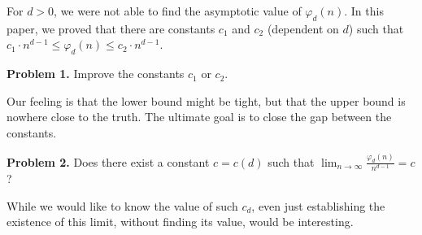 \documentclass[11pt,a4paper]{article}
\begin{document}
For $d>0$, we were not able to find the asymptotic value of $\varphi_d(n)$. In this paper, we proved that there are constants $c_1$ and $c_2$ (dependent on $d$) such that $c_1\cdot n^{d-1}\leq \varphi_d(n) \leq c_2\cdot n^{d-1}$.

{\bf Problem 1.} Improve the constants $c_1$ or $c_2$.

Our feeling is that the lower bound might be tight, but that the upper bound is nowhere close to the truth. The ultimate goal is to close the gap between the constants.

{\bf Problem 2.} Does there exist a constant $c = c(d)$ such that $\lim_{n\to \infty} \frac{\varphi_d(n)}{n^{d-1}} = c$?

While we would like to know the value of such $c_d$, even just establishing the existence of this limit, without finding its value, would be interesting.


%

\end{document}
